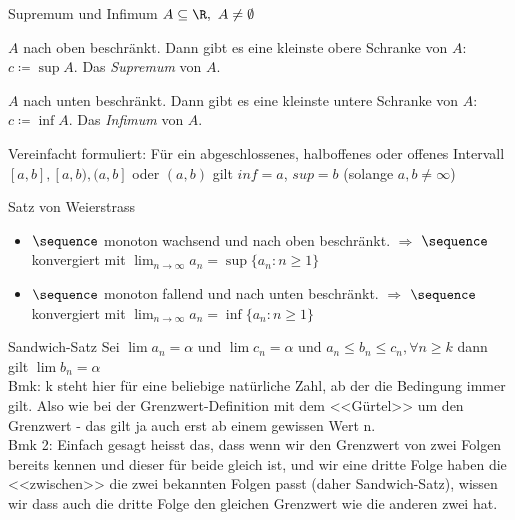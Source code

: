 
\begin{definition}{Supremum und Infimum}
    $A \subseteq \R, ~A\neq \emptyset$
    \begin{enumerateroman}
        \item $A$ nach oben beschränkt. Dann gibt es eine kleinste obere Schranke von $A$: $c \coloneqq \sup A$. Das \emph{Supremum} von $A$.
        \item $A$ nach unten beschränkt. Dann gibt es eine kleinste untere Schranke von $A$: $c \coloneqq \inf A$. Das \emph{Infimum} von $A$.
    \end{enumerateroman}
    \tcblower 
    Vereinfacht formuliert: Für ein abgeschlossenes, halboffenes oder offenes Intervall $[a,b], [a,b), (a,b]$ oder $(a,b)$ gilt $inf = a$, $sup = b$ (solange $a, b \neq \infty$)
\end{definition}

\begin{concept}{Satz von Weierstrass}
    \begin{itemize}
        \item $\sequence$ monoton wachsend und nach oben beschränkt. $\Rightarrow$ $\sequence$ konvergiert mit $\lim_{n \to \infty} a_n = \sup \{a_n : n \geq 1\}$
        \item $\sequence$ monoton fallend und nach unten beschränkt. $\Rightarrow$ $\sequence$ konvergiert mit $\lim_{n \to \infty} a_n = \inf \{a_n : n \geq 1\}$
    \end{itemize}
\end{concept}

\begin{theorem}{Sandwich-Satz}
    Sei $\lim a_n = \alpha$ und $\lim c_n = \alpha$ und $a_n \leq b_n \leq c_n, \forall n \geq k$ dann gilt $\lim b_n = \alpha$\\
    Bmk: k steht hier für eine beliebige natürliche Zahl, ab der die Bedingung immer gilt. Also wie bei der Grenzwert-Definition mit dem <<Gürtel>> um den Grenzwert - das gilt ja auch erst ab einem gewissen Wert n.\\
    Bmk 2: Einfach gesagt heisst das, dass wenn wir den Grenzwert von zwei Folgen bereits kennen und dieser für beide gleich ist, und wir eine dritte Folge haben die <<zwischen>> die zwei bekannten Folgen passt (daher Sandwich-Satz), wissen wir dass auch die dritte Folge den gleichen Grenzwert wie die anderen zwei hat.
\end{theorem}    



